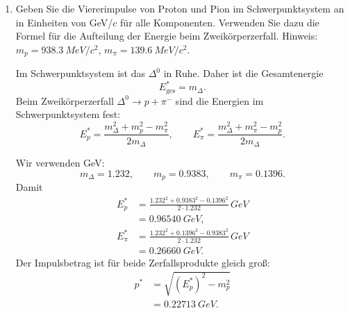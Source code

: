 \documentclass[11pt,a4paper]{scrartcl}
\begin{document}
\begin{enumerate}[label=(\alph*)]
            \begin{answerbox}
                Das $\Delta^0$ bewegt sich im Laborsystem mit
                \[
                    \boxed{\beta=0.41}
                \]
                beziehungsweise genauer
                \[
                    \boxed{v=0.40887\,c.}
                \]
            \end{answerbox}

        \item
            Geben Sie die Viererimpulse von Proton und Pion im Schwerpunktsystem an in
            Einheiten von GeV/$c$ für alle Komponenten. Verwenden Sie dazu die Formel für
            die Aufteilung der Energie beim Zweikörperzerfall. Hinweis:
            $m_p=\SI{938.3}{MeV/c^2}$, $m_{\pi}=\SI{139.6}{MeV/c^2}$.

            \begin{calculationbox}
                Im Schwerpunktsystem ist das $\Delta^0$ in Ruhe. Daher ist die Gesamtenergie
                \[
                    E^*_{\mathrm{ges}}=m_{\Delta}.
                \]
                Beim Zweikörperzerfall $\Delta^0\to p+\pi^-$ sind die Energien im
                Schwerpunktsystem fest:
                \[
                    E_p^*=\frac{m_{\Delta}^2+m_p^2-m_{\pi}^2}{2m_{\Delta}},
                    \qquad
                    E_{\pi}^*=\frac{m_{\Delta}^2+m_{\pi}^2-m_p^2}{2m_{\Delta}}.
                \]

                \begin{calculationbox}
                    Wir verwenden GeV:
                    \[
                        m_{\Delta}=1.232,
                        \qquad
                        m_p=0.9383,
                        \qquad
                        m_{\pi}=0.1396.
                    \]
                    Damit
                    \begin{align*}
                        E_p^*
                        &=\frac{1.232^2+0.9383^2-0.1396^2}{2\cdot1.232}\,\si{GeV}\\
                        &=\SI{0.96540}{GeV},\\[0.5em]
                        E_{\pi}^*
                        &=\frac{1.232^2+0.1396^2-0.9383^2}{2\cdot1.232}\,\si{GeV}\\
                        &=\SI{0.26660}{GeV}.
                    \end{align*}
                    Der Impulsbetrag ist für beide Zerfallsprodukte gleich groß:
                    \begin{align*}
                        p^*
                        &=\sqrt{(E_p^*)^2-m_p^2}\\
                        &=\SI{0.22713}{GeV}.
                    \end{align*}
                \end{calculationbox}


\end{calculationbox}
\end{enumerate}
\end{document}

